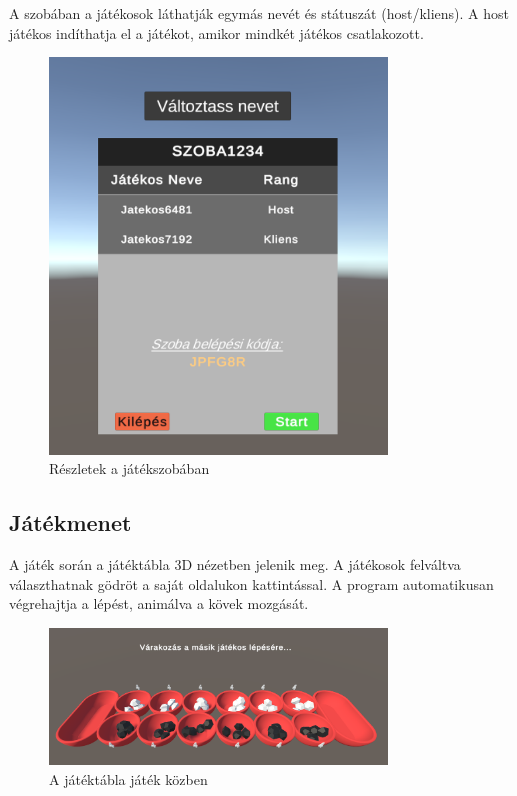 A szobában a játékosok láthatják egymás nevét és státuszát (host/kliens). A host játékos indíthatja el a játékot, amikor mindkét játékos csatlakozott.

\begin{figure}[h]
	\centering
	\includegraphics[width=0.8\textwidth]{lobby}
	\caption{Részletek a játékszobában}
	\label{fig:lobby-details}
\end{figure}

\subsection{Játékmenet}
A játék során a játéktábla 3D nézetben jelenik meg. A játékosok felváltva választhatnak gödröt a saját oldalukon kattintással. A program automatikusan végrehajtja a lépést, animálva a kövek mozgását.

\begin{figure}[h]
	\centering
	\includegraphics[width=0.8\textwidth]{gamestart}
	\caption{A játéktábla játék közben}
	\label{fig:game-start}
\end{figure}

